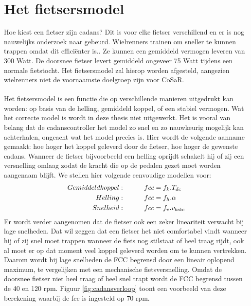 \documentclass[12pt,a4paper,oneside]{book}
\newcommand\tab[1][1cm]{\hspace*{#1}}
\begin{document}
\section{Het fietsersmodel}
Hoe kiest een fietser zijn cadans? Dit is voor elke fietser verschillend en er is nog nauwelijks onderzoek naar gebeurd. Wielrenners trainen om sneller te kunnen trappen omdat dit efficiënter is.. Ze kunnen een gemiddeld vermogen leveren van 300 Watt. De doorsnee fietser levert gemiddeld ongeveer 75 Watt tijdens een normale fietstocht. Het fietsersmodel zal hierop worden afgesteld, aangezien wielrenners niet de voornaamste doelgroep zijn voor CoSaR.
\\\\
Het fietsersmodel is een functie die op verschillende manieren uitgedrukt kan worden: op basis van de helling, gemiddeld koppel, of een stabiel vermogen. Wat het correcte model is wordt in deze thesis niet uitgewerkt. Het is vooral van belang dat de cadanscontroller het model zo snel en zo nauwkeurig mogelijk kan achterhalen, ongeacht wat het model precies is. Hier wordt de volgende aanname gemaakt: hoe hoger het koppel geleverd door de fietser, hoe hoger de gewenste cadans. Wanneer de fietser bijvoorbeeld een helling oprijdt schakelt hij of zij een versnelling omlaag zodat de kracht die op de pedalen gezet moet worden aangenaam blijft. We stellen hier volgende eenvoudige modellen voor:
\begin{align*}
Gemiddeld koppel:\tab fcc &= f_k . T_{dc}\\
Helling:\tab fcc &= f_h . \alpha\\
Snelheid:\tab fcc &= f_v . v_{bike}
\end{align*}
Er wordt verder aangenomen dat de fietser ook een zeker lineariteit verwacht bij lage snelheden. Dat wil zeggen dat een fietser het niet comfortabel vindt wanneer hij of zij snel moet trappen wanneer de fiets nog stilstaat of heel traag rijdt, ook al moet er op dat moment veel koppel geleverd worden om te kunnen vertrekken. Daarom wordt bij lage snelheden de FCC begrensd door een lineair oplopend maximum, te vergelijken met een mechanische fietsversnelling. Omdat de doorsnee fietser niet heel traag of heel snel trapt wordt de FCC begrensd tussen de 40 en 120 rpm. Figuur \ref{fig:cadansverloop} toont een voorbeeld van deze berekening waarbij de fcc is ingesteld op 70 rpm.
\end{document}
